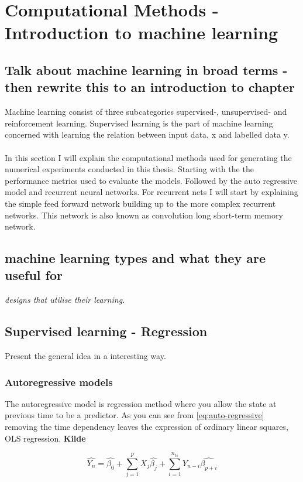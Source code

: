 \section{Computational Methods  - Introduction to machine learning} \label{sec:comp_met}
\subsection{Talk about machine learning in broad terms - then rewrite this to an introduction to chapter}
Machine learning consist of three subcategories supervised-, unsupervised- and reinforcement learning. Supervised learning is the part of machine learning concerned with learning the relation between input data, x and labelled data y. 
\\ \\
In this section I will explain the computational methods used for generating the numerical experiments conducted in this thesis. Starting with the the performance metrics used to evaluate the models. Followed by the auto regressive model and recurrent neural networks. For recurrent nets I will start by explaining the simple feed forward network building up to the more complex recurrent networks. This network is also known as convolution long short-term memory network.
\subsection{machine learning types and what they are useful for}
\textit{designs that utilise their learning. }
\subsection{Supervised learning - Regression}
Present the general idea in a interesting way.

\subsubsection{Autoregressive models} \label{sec:ARmodels}
The autoregressive model is regression method where you allow the state at previous time to be a predictor. As you can see from \eqref{eq:auto-regressive} removing the time dependency leaves the expression of ordinary linear squares, OLS regression. \textbf{Kilde}

\begin{equation} \label{eq:AR}
    \hat{Y_n} = \hat{\beta_0} + \sum_{j=1}^p X_j\hat{\beta_j} + \sum_{i = 1}^{n_{ts}} Y_{n-i}\hat{\beta_{p+i}}
\end{equation}

